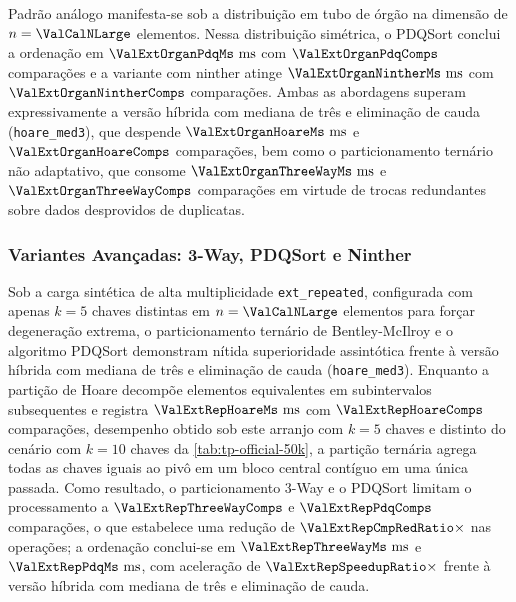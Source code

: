 \documentclass[12pt]{article}
\begin{document}
Padrão análogo manifesta-se sob a distribuição em tubo de órgão na dimensão de $n = \ValCalNLarge$ elementos. Nessa distribuição simétrica, o PDQSort conclui a ordenação em $\ValExtOrganPdqMs\text{ ms}$ com $\ValExtOrganPdqComps$ comparações e a variante com ninther atinge $\ValExtOrganNintherMs\text{ ms}$ com $\ValExtOrganNintherComps$ comparações. Ambas as abordagens superam expressivamente a versão híbrida com mediana de três e eliminação de cauda (\texttt{hoare\_med3}), que despende $\ValExtOrganHoareMs\text{ ms}$ e $\ValExtOrganHoareComps$ comparações, bem como o particionamento ternário não adaptativo, que consome $\ValExtOrganThreeWayMs\text{ ms}$ e $\ValExtOrganThreeWayComps$ comparações em virtude de trocas redundantes sobre dados desprovidos de duplicatas.

\subsubsection{Variantes Avançadas: 3-Way, PDQSort e Ninther}\label{sec:res-avancadas}

Sob a carga sintética de alta multiplicidade \texttt{ext\_repeated}, configurada com apenas $k = 5$ chaves distintas em $n = \ValCalNLarge$ elementos para forçar degeneração extrema, o particionamento ternário de Bentley-McIlroy e o algoritmo PDQSort demonstram nítida superioridade assintótica frente à versão híbrida com mediana de três e eliminação de cauda (\texttt{hoare\_med3}). Enquanto a partição de Hoare decompõe elementos equivalentes em subintervalos subsequentes e registra $\ValExtRepHoareMs\text{ ms}$ com $\ValExtRepHoareComps$ comparações, desempenho obtido sob este arranjo com $k=5$ chaves e distinto do cenário com $k=10$ chaves da \cref{tab:tp-official-50k}, a partição ternária agrega todas as chaves iguais ao pivô em um bloco central contíguo em uma única passada. Como resultado, o particionamento 3-Way e o PDQSort limitam o processamento a $\ValExtRepThreeWayComps$ e $\ValExtRepPdqComps$ comparações, o que estabelece uma redução de $\ValExtRepCmpRedRatio\times$ nas operações; a ordenação conclui-se em $\ValExtRepThreeWayMs\text{ ms}$ e $\ValExtRepPdqMs\text{ ms}$, com aceleração de $\ValExtRepSpeedupRatio\times$ frente à versão híbrida com mediana de três e eliminação de cauda.
\end{document}
